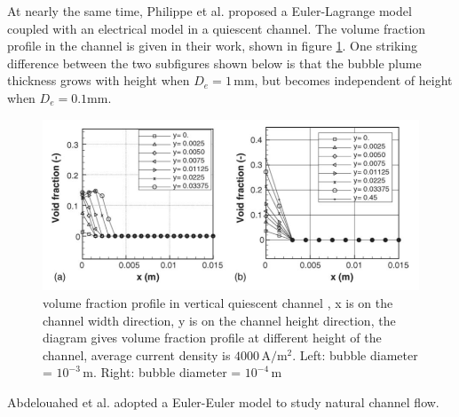 At nearly the same time, Philippe et al. \cite{philippe2005modelling} proposed a Euler-Lagrange model coupled with an electrical model in a quiescent channel. The volume fraction profile in the channel is given in their work, shown in figure \ref{lagrangianplume}. One striking difference between the two subfigures shown below is that the bubble plume thickness grows with height when $D_e = 1 \, \mathrm{mm}$, but becomes independent of height when $D_e = 0.1 \mathrm{mm}$.
\begin{figure}[H]
    \centering
    \includegraphics[scale=0.7]{volumeprofile.png}
    \caption{volume fraction profile in vertical quiescent channel \cite{philippe2005modelling}, x is on the channel width direction, y is on the channel height direction, the diagram gives volume fraction profile at different height of the channel, average current density is $4000 \, \mathrm{ A/m^2}$. Left: bubble diameter = $10^{-3}\, \mathrm{m}$. Right: bubble diameter = $10^{-4} \, \mathrm{m}$}
    \label{lagrangianplume}
\end{figure}



Abdelouahed et al. \cite{abdelouahed2014hydrodynamics}  adopted a Euler-Euler model to study natural channel flow.




